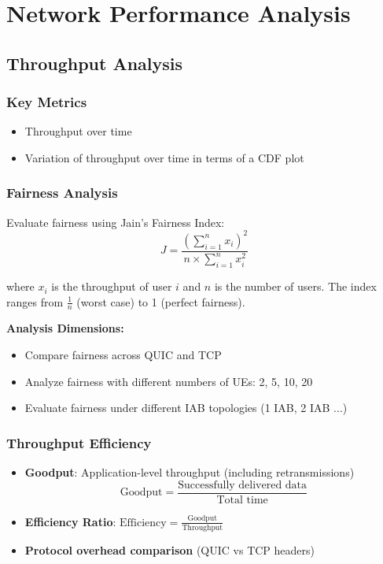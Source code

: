 \documentclass[11pt,a4paper]{article}
\begin{document}
\section{Network Performance Analysis}

\subsection{Throughput Analysis}

\subsubsection{Key Metrics}
\begin{itemize}
    \item Throughput over time
    \item Variation of throughput over time in terms of a CDF plot

\end{itemize}

\subsubsection{Fairness Analysis}

Evaluate fairness using Jain's Fairness Index:
\begin{equation}
    J = \frac{\left(\sum_{i=1}^{n} x_i\right)^2}{n \times \sum_{i=1}^{n} x_i^2}
\end{equation}

where $x_i$ is the throughput of user $i$ and $n$ is the number of users. The index ranges from $\frac{1}{n}$ (worst case) to 1 (perfect fairness).

\textbf{Analysis Dimensions:}
\begin{itemize}
    \item Compare fairness across QUIC and TCP
    \item Analyze fairness with different numbers of UEs: 2, 5, 10, 20
    \item Evaluate fairness under different IAB topologies (1 IAB, 2 IAB ...)
\end{itemize}

\subsubsection{Throughput Efficiency}
\begin{itemize}
    \item \textbf{Goodput}: Application-level throughput (including retransmissions)
        \begin{equation}
            \text{Goodput} = \frac{\text{Successfully delivered data}}{\text{Total time}}
        \end{equation}
    \item \textbf{Efficiency Ratio}: $\text{Efficiency} = \frac{\text{Goodput}}{\text{Throughput}}$
    \item \textbf{Protocol overhead comparison} (QUIC vs TCP headers)
\end{itemize}
\end{document}
